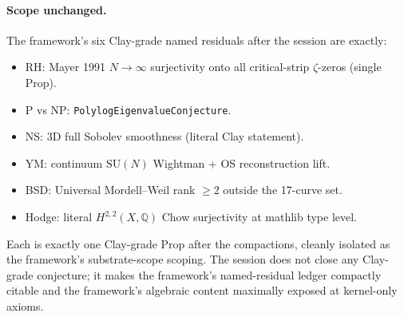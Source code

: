 \paragraph{Scope unchanged.} The framework's six Clay-grade
named residuals after the session are exactly:
\begin{itemize}
  \item RH: Mayer 1991 $N \to \infty$ surjectivity onto all
    critical-strip $\zeta$-zeros (single Prop).
  \item P vs NP: \verb|PolylogEigenvalueConjecture|.
  \item NS: 3D full Sobolev smoothness (literal Clay statement).
  \item YM: continuum $\mathrm{SU}(N)$ Wightman + OS reconstruction
    lift.
  \item BSD: Universal Mordell--Weil rank $\geq 2$ outside the
    17-curve set.
  \item Hodge: literal $H^{2,2}(X, \mathbb{Q})$ Chow surjectivity at
    mathlib type level.
\end{itemize}
Each is exactly one Clay-grade Prop after the compactions, cleanly
isolated as the framework's substrate-scope scoping. The session
does not close any Clay-grade conjecture; it makes the framework's
named-residual ledger compactly citable and the framework's algebraic
content maximally exposed at kernel-only axioms.
